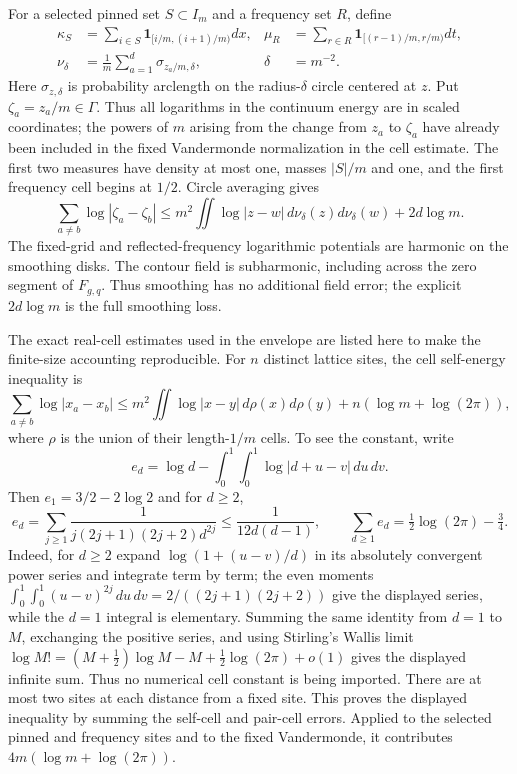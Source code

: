 For a selected pinned set $S\subset I_m$ and a frequency set $R$, define
\begin{align*}
 \kappa_S&=\sum_{i\in S}\mathbf1_{[i/m,(i+1)/m)}dx,
 &\mu_R&=\sum_{r\in R}\mathbf1_{[(r-1)/m,r/m)}dt,\\
 \nu_\delta&=\frac1m\sum_{a=1}^{d}\sigma_{z_a/m,\delta},
 &\delta&=m^{-2}.
\end{align*}
Here $\sigma_{z,\delta}$ is probability arclength on the radius-$\delta$
circle centered at $z$.
Put $\zeta_a=z_a/m\in\Gamma$.  Thus all logarithms in the continuum
energy are in scaled coordinates; the powers of $m$ arising from the change
from $z_a$ to $\zeta_a$ have already been included in the fixed
Vandermonde normalization in the cell estimate.
The first two measures have density at most one,
masses $|S|/m$ and one, and the first frequency cell begins at $1/2$.
Circle averaging gives
\begin{equation}\label{eq:p0-circle}
 \sum_{a\ne b}\log|\zeta_a-\zeta_b|
 \le m^2\iint\log|z-w|\,d\nu_\delta(z)d\nu_\delta(w)
                                          +2d\log m.
\end{equation}
The fixed-grid and reflected-frequency logarithmic potentials are harmonic
on the smoothing disks.  The contour field is subharmonic, including across
the zero segment of $F_{g,q}$.  Thus smoothing has no additional field
error; the explicit $2d\log m$ is the full smoothing loss.

The exact real-cell estimates used in the envelope are listed here to make
the finite-size accounting reproducible.  For $n$ distinct lattice sites,
the cell self-energy inequality is
\[
 \sum_{a\ne b}\log|x_a-x_b|
 \le m^2\iint\log|x-y|\,d\rho(x)d\rho(y)
                                  +n(\log m+\log(2\pi)),
\]
where $\rho$ is the union of their length-$1/m$ cells.  To see the constant,
write
\[
 e_d=\log d-\int_0^1\!\int_0^1\log|d+u-v|\,du\,dv.
\]
Then $e_1=3/2-2\log2$ and for $d\ge2$,
\[
 e_d=\sum_{j\ge1}\frac1{j(2j+1)(2j+2)d^{2j}}
       \le\frac1{12d(d-1)},\qquad
 \sum_{d\ge1}e_d=\tfrac12\log(2\pi)-\tfrac34.
\]
Indeed, for $d\ge2$ expand
$\log(1+(u-v)/d)$ in its absolutely convergent power series and integrate
term by term; the even moments
$\int_0^1\!\int_0^1(u-v)^{2j}\,du\,dv=2/((2j+1)(2j+2))$
give the displayed series, while the $d=1$ integral is elementary.  Summing
the same identity from $d=1$ to $M$, exchanging the positive series, and
using Stirling's Wallis limit~\cite{WhittakerWatson}
$\log M!=(M+\tfrac12)\log M-M+\tfrac12\log(2\pi)+o(1)$
gives the displayed infinite sum.  Thus no numerical cell constant is being
imported.
There are at most two sites at each distance from a fixed site.  This proves
the displayed inequality by summing the self-cell and pair-cell errors.
Applied to the selected pinned and frequency sites and to the fixed
Vandermonde, it contributes $4m(\log m+\log(2\pi))$.

